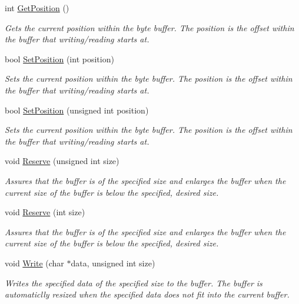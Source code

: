 \begin{DoxyCompactItemize}
int \hyperlink{class_senergy_1_1_byte_buffer_a286e096451b62a14a8d645e1c9da62af}{Get\-Position} ()
\begin{DoxyCompactList}\small\item\em Gets the current position within the byte buffer. The position is the offset within the buffer that writing/reading starts at. \end{DoxyCompactList}\item 
bool \hyperlink{class_senergy_1_1_byte_buffer_a13dd8a2eec8b93ac224f0da614c7f6f8}{Set\-Position} (int position)
\begin{DoxyCompactList}\small\item\em Sets the current position within the byte buffer. The position is the offset within the buffer that writing/reading starts at. \end{DoxyCompactList}\item 
bool \hyperlink{class_senergy_1_1_byte_buffer_a52af5d53098be5cb179f9a05f84f39e2}{Set\-Position} (unsigned int position)
\begin{DoxyCompactList}\small\item\em Sets the current position within the byte buffer. The position is the offset within the buffer that writing/reading starts at. \end{DoxyCompactList}\item 
void \hyperlink{class_senergy_1_1_byte_buffer_a25b96a3aed3e617362dbaee66915c33a}{Reserve} (unsigned int size)
\begin{DoxyCompactList}\small\item\em Assures that the buffer is of the specified size and enlarges the buffer when the current size of the buffer is below the specified, desired size. \end{DoxyCompactList}\item 
void \hyperlink{class_senergy_1_1_byte_buffer_aa650965d24700a696af31aa9cc20fa68}{Reserve} (int size)
\begin{DoxyCompactList}\small\item\em Assures that the buffer is of the specified size and enlarges the buffer when the current size of the buffer is below the specified, desired size. \end{DoxyCompactList}\item 
void \hyperlink{class_senergy_1_1_byte_buffer_a9a561b3dd8778ee68e75e5a62a38fa60}{Write} (char $\ast$data, unsigned int size)
\begin{DoxyCompactList}\small\item\em Writes the specified data of the specified size to the buffer. The buffer is automaticlly resized when the specified data does not fit into the current buffer. \end{DoxyCompactList}\item 

\end{DoxyCompactItemize}
